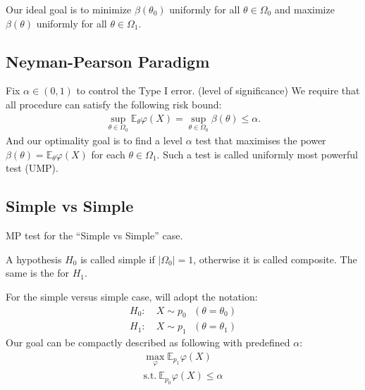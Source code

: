 Our ideal goal is to minimize $\beta(\theta_0)$ uniformly for all $\theta\in\Omega_0$
and maximize $\beta(\theta)$ uniformly for all $\theta\in\Omega_1$.

\subsection{Neyman-Pearson Paradigm}

Fix $\alpha\in(0,1)$ to control the Type I error. (level of significance)
We require that all procedure can satisfy the following risk bound:
\begin{align}
    \sup_{\theta\in\Omega_0}\mathbb{E}_\theta\varphi(X) 
    = \sup_{\theta\in\Omega_0}\beta(\theta)\leq\alpha.
\end{align}
And our optimality goal is to find a level $\alpha$ test that maximises the power
$\beta(\theta)=\mathbb{E}_\theta\varphi(X)$ for each $\theta\in\Omega_1$.
Such a test is called uniformly most powerful test (UMP).

\subsection{Simple vs Simple}

MP test for the ``Simple vs Simple'' case.

\begin{definition}
    A hypothesis $H_0$ is called simple if $|\Omega_0|=1$,
    otherwise it is called composite.
    The same is the for $H_1$.
\end{definition}


For the simple versus simple case, will adopt the notation:
\begin{align}
    H_0:&~X\sim{p_0}~~~(\theta=\theta_0)\\
    H_1:&~X\sim{p_1}~~~(\theta=\theta_1)
\end{align}
Our goal can be compactly described as following with predefined $\alpha$:
\begin{gather}
    \max_\varphi\mathbb{E}_{p_1}\varphi(X)\\
    \text{s.t.}~\mathbb{E}_{p_0}\varphi(X)\leq{\alpha}
\end{gather}

